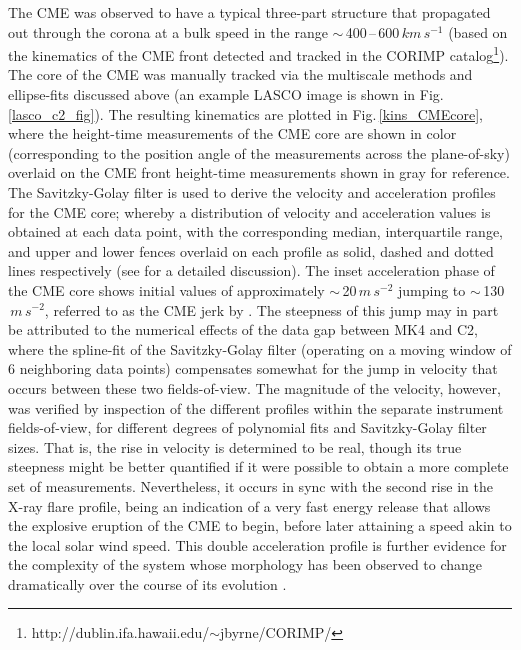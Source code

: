 \documentclass[namedreferences]{solarphysics}
\begin{document}
\begin{article}
The CME was observed to have a typical three-part structure that propagated out through the corona at a bulk speed in the range $\sim$\,400\,--\,600$\,km\,s^{-1}$ (based on the kinematics of the CME front detected and tracked in the CORIMP catalog\footnote{http://dublin.ifa.hawaii.edu/$\sim$jbyrne/CORIMP/}). The core of the CME was manually tracked via the multiscale methods and ellipse-fits discussed above (an example LASCO image is shown in Fig.\,\ref{lasco_c2_fig}). The resulting kinematics are plotted in Fig.\,\ref{kins_CMEcore}, where the height-time measurements of the CME core are shown in color (corresponding to the position angle of the measurements across the plane-of-sky) overlaid on the CME front height-time measurements shown in gray for reference. The Savitzky-Golay filter is used to derive the velocity and acceleration profiles for the CME core; whereby a distribution of velocity and acceleration values is obtained at each data point, with the corresponding median, interquartile range, and upper and lower fences overlaid on each profile as solid, dashed and dotted lines respectively (see  for a detailed discussion). The inset acceleration phase of the CME core shows initial values of approximately $\sim$\,20$\,m\,s^{-2}$ jumping to $\sim$\,130$\,m\,s^{-2}$, referred to as the CME jerk by . The steepness of this jump may in part be attributed to the numerical effects of the data gap between MK4 and C2, where the spline-fit of the Savitzky-Golay filter (operating on a moving window of 6 neighboring data points) compensates somewhat for the jump in velocity that occurs between these two fields-of-view. The magnitude of the velocity, however, was verified by inspection of the different profiles within the separate instrument fields-of-view, for different degrees of polynomial fits and Savitzky-Golay filter sizes. That is, the rise in velocity is determined to be real, though its true steepness might be better quantified if it were possible to obtain a more complete set of measurements. Nevertheless, it occurs in sync with the second rise in the X-ray flare profile, being an indication of a very fast energy release that allows the explosive eruption of the CME to begin, before later attaining a speed akin to the local solar wind speed. This double acceleration profile is further evidence for the complexity of the system whose morphology has been observed to change dramatically over the course of its evolution \cite{2013ApJS..206...19M, 2012ApJ...746L...5S}.




\end{article}
\end{document}

